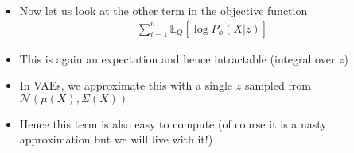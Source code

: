 \begin{frame}
	\begin{columns}
		\begin{overlayarea}{\textwidth}{\textheight}
		\vspace{1cm}
		
		\end{overlayarea}
		\begin{overlayarea}{\textwidth}{\textheight}
			\begin{itemize}[<+->]\justifying
				\item Now let us look at the other term in the objective function
				\begin{align*}
				\sum_{i=1}^n \mathbb{E}_Q[\log P_\phi(X|z)]
				\end{align*}
				\item This is again an expectation and hence intractable (integral over $z$)
				\item In VAEs, we approximate this with a single $z$ sampled from $\mathcal{N}(\mu(X), \Sigma(X))$ 
				
				\item Hence this term is also easy to compute (of course it is a nasty approximation but we will live with it!)
			\end{itemize}
		\end{overlayarea}
	\end{columns}
\end{frame}

